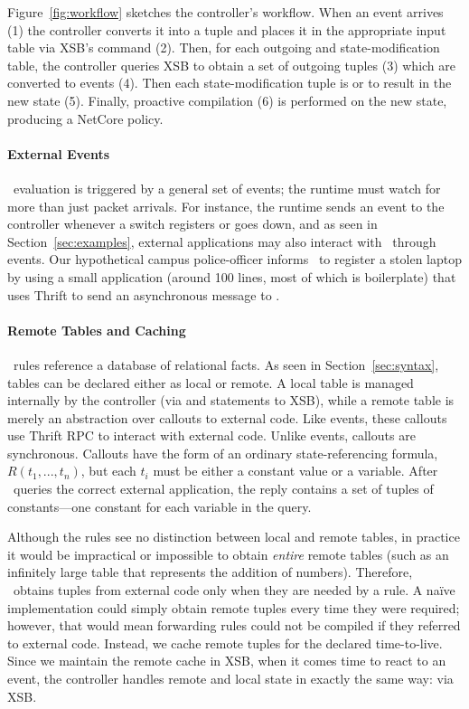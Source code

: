 Figure~\ref{fig:workflow} sketches the controller's workflow. When an event
arrives (1) the controller converts it into a tuple and places it in the appropriate
input table via XSB's  command (2). Then, for each
outgoing and state-modification table, the controller queries XSB to obtain a set
of outgoing tuples (3) which are converted to events (4). Then each state-modification
tuple is  or  to result in the new state (5).
Finally, proactive compilation (6) is performed on the new state,
producing a NetCore policy. 

\paragraph{External Events}

\flowlog\ evaluation is triggered by a general set of events; the runtime must watch
for more than just packet arrivals.
For instance, the runtime sends an event to the controller whenever a switch
registers or goes down, and as seen in Section~\ref{sec:examples}, external
applications may also interact with \flowlog\ through events. Our hypothetical
campus police-officer informs \flowlog\ to register a stolen laptop by
using a small application (around 100 lines, most of which is boilerplate) that uses
Thrift to send an asynchronous message to \flowlog.

\paragraph{Remote Tables and Caching}

\flowlog\ rules reference a database of relational facts. As seen in
Section~\ref{sec:syntax}, tables can be declared either as local or remote. A
local table is managed internally by the controller (via  and
 statements to XSB), while a remote table is merely an
abstraction over callouts to external code. Like events,
these callouts use Thrift RPC to interact with external code. Unlike
events, callouts are synchronous. Callouts have the form of an ordinary state-referencing
formula, $R(t_1, ..., t_n)$, but each $t_i$ must be either a constant value or
a variable. After \flowlog\ queries the correct external
application, the reply contains a set of tuples of constants---one constant for
each variable in the query.
 
Although the rules see no distinction between local and remote
tables, in practice it would be impractical or impossible
to obtain \emph{entire} remote tables (such as an infinitely large
table that represents the addition of numbers).
Therefore, \flowlog\ obtains tuples from external
code only when they are needed by a rule. 
A na{\"i}ve implementation could simply obtain remote tuples
every time they were required; however, that would mean forwarding rules could not
be compiled if they referred to external code. Instead, we cache remote tuples
for the declared time-to-live. Since we
maintain the remote cache in XSB, when it comes time to react to an event, the
controller handles remote and local state in exactly the same way: via XSB.

